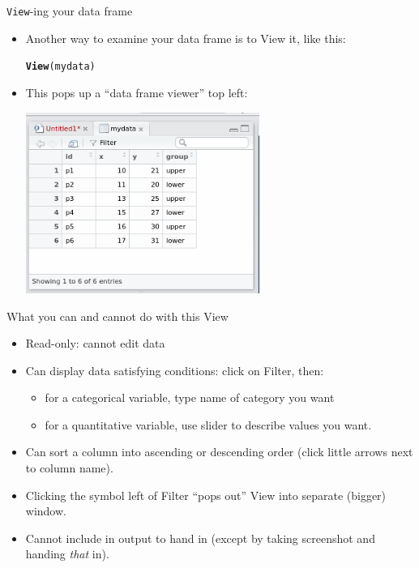 \documentclass[unknownkeysallowed]{beamer}\usepackage[]{graphicx}\usepackage[]{color}
\makeatletter
\newcommand{\hlstd}[1]{\textcolor[rgb]{0.345,0.345,0.345}{#1}}%
\newcommand{\hlkwd}[1]{\textcolor[rgb]{0.737,0.353,0.396}{\textbf{#1}}}%
\newenvironment{kframe}{%
 \def\at@end@of@kframe{}%
 \ifinner\ifhmode%
  \def\at@end@of@kframe{\end{minipage}}%
  \begin{minipage}{\columnwidth}%
 \fi\fi%
 \def\FrameCommand##1{\hskip\@totalleftmargin \hskip-\fboxsep
 \colorbox{shadecolor}{##1}\hskip-\fboxsep
     \hskip-\linewidth \hskip-\@totalleftmargin \hskip\columnwidth}%
 \MakeFramed {\advance\hsize-\width
   \@totalleftmargin\z@ \linewidth\hsize
   \@setminipage}}%
 {\par\unskip\endMakeFramed%
 \at@end@of@kframe}
\newenvironment{knitrout}{}{} %
\makeatother
\begin{document}
\begin{frame}[fragile]{\texttt{View}-ing your data frame}
    
    \begin{itemize}
    \item Another way to examine your data frame is to View it, like this:
      
\begin{knitrout}
\color{fgcolor}\begin{kframe}
\begin{alltt}
\hlkwd{View}\hlstd{(mydata)}
\end{alltt}
\end{kframe}
\end{knitrout}

\item This pops up a ``data frame viewer'' top left:
  
  \includegraphics[width=0.6\textwidth]{viewview}
    \end{itemize}
  
\end{frame}

\begin{frame}[fragile]{What you can and cannot do with this View}
  
  \begin{itemize}
  \item Read-only: cannot edit data
  \item Can display data satisfying conditions: click on Filter, then:
    \begin{itemize}
    \item for a categorical variable, type name of category you want
    \item for a quantitative variable, use slider to describe values
      you want.
    \end{itemize}
  \item Can sort a column into ascending or descending order (click
    little arrows next to column name).
    
  \item Clicking the symbol left of Filter ``pops out'' View into
    separate (bigger) window.
  \item Cannot include in output to hand in (except by taking
    screenshot and handing \emph{that} in).
  \end{itemize}
  
\end{frame}
\end{document}
